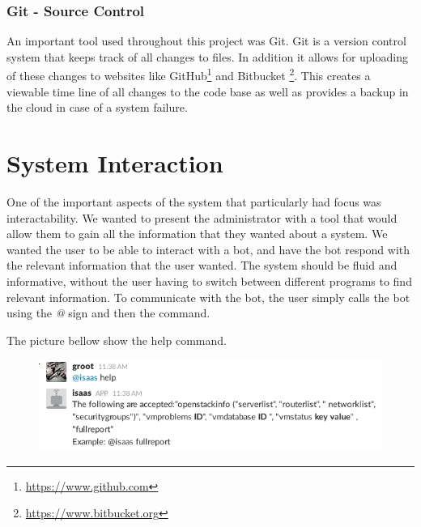 \documentclass[12pt]{article}
\begin{document}
\subsubsection{Git - Source Control}
An important tool used throughout this project was Git. Git is a version control system that keeps track of all changes to files. In addition it allows for uploading of these changes to websites like GitHub\footnote{\href{https://www.github.com}{https://www.github.com}} and Bitbucket \footnote{\href{https://www.bitbucket.org}{https://www.bitbucket.org}}. This creates a viewable time line of all changes to the code base as well as provides a backup in the cloud in case of a system failure.

\section{System Interaction}
One of the important aspects of the system that particularly had focus was interactability. We wanted to present the administrator with a tool that would allow them to gain all the information that they wanted about a system. We wanted the user to be able to interact with a bot, and have the bot respond with the relevant information that the user wanted. The system should be fluid and informative, without the user having to switch between different programs to find relevant information. To communicate with the bot, the user simply calls the bot using the \emph{@} sign and then the command.

The picture bellow show the help command.
\begin{figure}[H]
    \begin{mdframed}
    \includegraphics[scale=.5]{./pic/2017-06-26-113851_606x161_scrot.png}
    \end{mdframed}
\end{figure}
\end{document}
